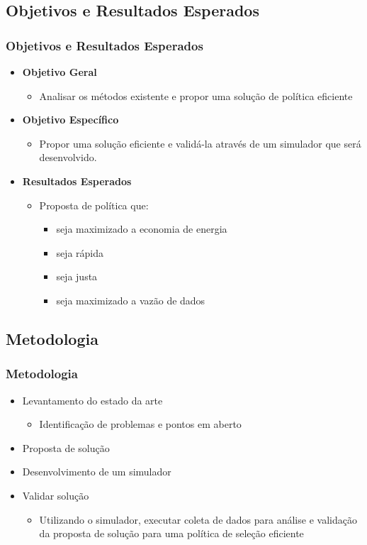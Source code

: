 \documentclass{beamer}
\begin{document}
\subsection{Objetivos e Resultados Esperados}
\begin{frame}
    \frametitle{Objetivos e Resultados Esperados}
    \begin{itemize}
      \item \textbf{Objetivo Geral}
        \begin{itemize}
          \item Analisar os métodos existente e propor uma solução de política
          eficiente
        \end{itemize}
      \item \textbf{Objetivo Específico}
        \begin{itemize}
          \item Propor uma solução eficiente e validá-la através de um simulador
          que será desenvolvido.
        \end{itemize}
      \item \textbf{Resultados Esperados}
        \begin{itemize}
          \item Proposta de política que:
            \begin{itemize}
              \item seja maximizado a economia de energia
              \item seja rápida
              \item seja justa
              \item seja maximizado a vazão de dados
            \end{itemize}
        \end{itemize}
    \end{itemize}
\end{frame}


\subsection{Metodologia}
\begin{frame}
    \frametitle{Metodologia}
    \begin{itemize}
    \pause \item Levantamento do estado da arte
        \begin{itemize}
            \item Identificação de problemas e pontos em aberto
        \end{itemize}
    \pause \item Proposta de solução
    \pause \item Desenvolvimento de um simulador
    \pause \item Validar solução
        \begin{itemize}
            \item Utilizando o simulador, executar coleta de dados para análise
                e validação da proposta de solução para uma política de seleção
        eficiente
        \end{itemize}
    \end{itemize}
\end{frame}
\end{document}
